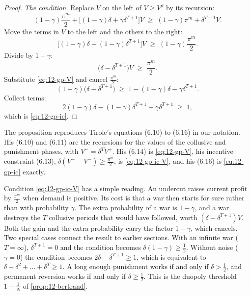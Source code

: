 \begin{proof}
\emph{The condition.} Replace $V$ on the left of $V \ge V^d$ by its recursion:
\begin{equation*}
(1 - \gamma)\frac{\pi^m}{2} + \bigl[(1 - \gamma)\delta + \gamma\delta^{T + 1}\bigr]V \;\ge\; (1 - \gamma)\pi^m + \delta^{T + 1}V .
\end{equation*}
Move the terms in $V$ to the left and the others to the right:
\begin{equation*}
\bigl[(1 - \gamma)\delta - (1 - \gamma)\delta^{T + 1}\bigr]V \;\ge\; (1 - \gamma)\frac{\pi^m}{2} .
\end{equation*}
Divide by $1 - \gamma$:
\begin{equation}\label{eq:12-gp-ic-V}
\bigl(\delta - \delta^{T + 1}\bigr)V \;\ge\; \frac{\pi^m}{2} .
\end{equation}
Substitute \eqref{eq:12-gp-V} and cancel $\frac{\pi^m}{2}$:
\begin{equation*}
(1 - \gamma)\bigl(\delta - \delta^{T + 1}\bigr) \;\ge\; 1 - (1 - \gamma)\delta - \gamma\delta^{T + 1} .
\end{equation*}
Collect terms:
\begin{equation*}
2(1 - \gamma)\delta - (1 - \gamma)\delta^{T + 1} + \gamma\delta^{T + 1} \;\ge\; 1 ,
\end{equation*}
which is \eqref{eq:12-gp-ic}.
\end{proof}

The proposition reproduces Tirole's equations (6.10) to (6.16) in our notation. His (6.10) and (6.11) are the
recursions for the values of the collusive and punishment phases, with $V^- = \delta^TV^+$. His (6.14) is
\eqref{eq:12-gp-V}, his incentive constraint (6.13), $\delta(V^+ - V^-) \ge \frac{\pi^m}{2}$, is
\eqref{eq:12-gp-ic-V}, and his (6.16) is \eqref{eq:12-gp-ic} exactly.

Condition \eqref{eq:12-gp-ic-V} has a simple reading. An undercut raises current profit by $\frac{\pi^m}{2}$ when
demand is positive. Its cost is that a war then starts for sure rather than with probability $\gamma$. The extra
probability of a war is $1 - \gamma$, and a war destroys the $T$ collusive periods that would have followed, worth
$(\delta - \delta^{T + 1})V$. Both the gain and the extra probability carry the factor $1 - \gamma$, which cancels.
Two special cases connect the result to earlier sections. With an infinite war ($T = \infty$), $\delta^{T + 1} = 0$
and the condition becomes $\delta(1 - \gamma) \ge \frac{1}{2}$. Without noise ($\gamma = 0$) the condition becomes
$2\delta - \delta^{T + 1} \ge 1$, which is equivalent to $\delta + \delta^2 + \dots + \delta^T \ge 1$. A long enough
punishment works if and only if $\delta > \frac{1}{2}$, and permanent reversion works if and only if
$\delta \ge \frac{1}{2}$. This is the duopoly threshold $1 - \frac{1}{N}$ of \cref{prop:12-bertrand}.

